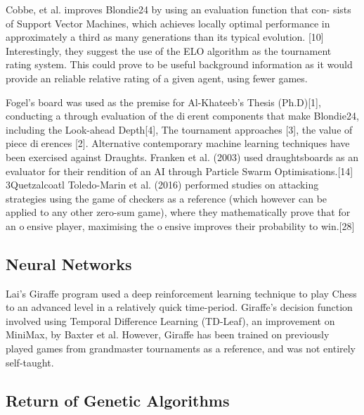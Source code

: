 \documentclass[12pt,a4paper]{article}
\begin{document}
        Cobbe, et al. improves Blondie24 by using an evaluation function that con- sists of Support Vector Machines, which achieves locally optimal performance in approximately a third as many generations than its typical evolution. [10] Interestingly, they suggest the use of the ELO algorithm as the tournament rating system. This could prove to be useful background information as it would provide an reliable relative rating of a given agent, using fewer games.
        
        Fogel's board was used as the premise for Al-Khateeb's Thesis (Ph.D)[1], conducting a through evaluation of the dierent components that make Blondie24, including the Look-ahead Depth[4], The tournament approaches [3], the value of piece dierences [2]. Alternative contemporary machine learning techniques have been exercised against Draughts. Franken et al. (2003) used draughtsboards as an evaluator for their rendition of an AI through Particle Swarm Optimisations.[14] 3Quetzalcoatl Toledo-Marin et al. (2016) performed studies on attacking strategies using the game of checkers as a reference (which however can be applied to any other zero-sum game), where they mathematically prove that for an oensive player, maximising the oensive improves their probability to win.[28]
    \subsection{Neural Networks}
    
        Lai's Giraffe \cite{lai_giraffe:_2015} program used a deep reinforcement learning technique to play Chess to an advanced level in a relatively quick time-period. Giraffe's decision function involved using Temporal Difference Learning (TD-Leaf), an improvement on MiniMax, by Baxter et al. \cite{baxter_tdleaflambda_1999} However, Giraffe has been trained on previously played games from grandmaster tournaments as a reference, and was not entirely self-taught.
    \subsection{Return of Genetic Algorithms}
\end{document}
